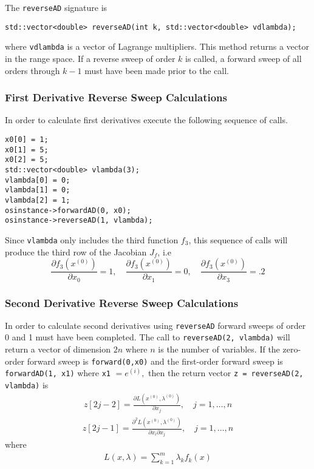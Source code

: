 \documentclass[11pt]{article}
\newcommand{\D}[2]{ \frac{\partial #1}{\partial #2} }
\newcommand{\DD}[3]{ \frac{\partial^2 #1}{\partial #2 \partial #3} }
\renewcommand{\_}{{\char"5F}}
\renewcommand{\{}{{\char"7B}}
\renewcommand{\}}{{\char"7D}}
\renewcommand{\^}{{\char"0D}}
\renewcommand{\'}{{\char"0D}}
\begin{document}
The {\tt reverseAD} signature is
\begin{verbatim}
std::vector<double> reverseAD(int k, std::vector<double> vdlambda);
\end{verbatim}
where {\tt vdlambda} is a vector of Lagrange multipliers.  This method returns a vector in the range space. If a reverse sweep of order $k$ is called, a forward sweep of all orders  through  $k -1$ must have been made prior to the call.

\subsubsection{First Derivative Reverse Sweep Calculations}

In order to calculate first derivatives execute the following sequence of calls.
\begin{verbatim}
x0[0] = 1;
x0[1] = 5;
x0[2] = 5;
std::vector<double> vlambda(3);
vlambda[0] = 0;
vlambda[1] = 0;
vlambda[2] = 1;
osinstance->forwardAD(0, x0);
osinstance->reverseAD(1, vlambda);
\end{verbatim}
Since {\tt vlambda} only includes 
the third function $f_3$, this sequence of calls will produce the third row of the 
Jacobian $J_f$, i.e
$$
\D{f_{3}(x^{(0)})}{x_{0}}  = 1,  \quad \D{f_{3}(x^{(0)})}{x_{1}}  = 0, \quad  \D{f_{3}(x^{(0)})}{x_{3}}  = .2
$$

\subsubsection{Second Derivative Reverse Sweep Calculations}

In order to calculate second derivatives using {\tt reverseAD} forward sweeps of order 0 and 1 must have been completed.  The call to {\tt reverseAD(2, vlambda)} will return a vector of dimension $2n$ where $n$ is the number of variables.  If the zero-order forward sweep is {\tt forward(0,x0)} and the first-order forward sweep is {\tt forwardAD(1, x1)} where {\tt x1} $= e^{(i)},$ then the return vector {\tt z = reverseAD(2,  vlambda)} is
\begin{eqnarray}
z[2j - 2]  = \D{L (x^{(0)}, \lambda^{(0)})}{x_{j}}, \quad j = 1, \ldots, n
\end{eqnarray}
\begin{eqnarray}
z[2j - 1]  = \DD{L(x^{(0)}, \lambda^{(0)})}{x_{i}}{x_{j}}, \quad j = 1, \ldots, n
\end{eqnarray}
where
\begin{eqnarray}
L (x, \lambda) = \sum_{k = 1}^{m} \lambda_{k} f_{k}(x)
\end{eqnarray}
\end{document}
